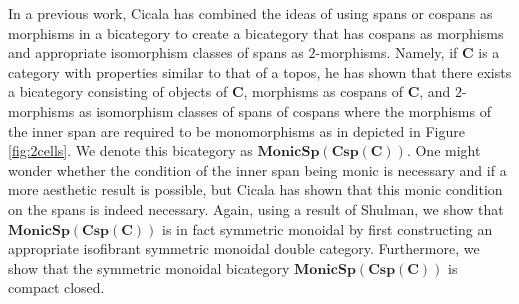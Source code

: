 \documentclass[11pt]{amsart}
\newcommand{\cat}[1]{\mathbf{#1}}
\theoremstyle{remark}
\theoremstyle{definition}
\begin{document}
In a previous work, Cicala \cite{Cic} has combined the ideas of using spans or cospans as morphisms in a bicategory to create a bicategory that has cospans as morphisms and appropriate isomorphism classes of spans as $2$-morphisms. Namely, if $\cat{C}$ is a category with properties similar to that of a topos, he has shown that there exists a bicategory consisting of objects of $\cat{C}$, morphisms as cospans of $\cat{C}$, and $2$-morphisms as isomorphism classes of spans of cospans where the morphisms of the inner span are required to be monomorphisms as in depicted in Figure \ref{fig:2cells}. We denote this bicategory as $\cat{MonicSp(Csp(C))}$. One might wonder whether the condition of the inner span being monic is necessary and if a more aesthetic result is possible, but Cicala has shown that this monic condition on the spans is indeed necessary. Again, using a result of Shulman, we show that $\cat{MonicSp(Csp(C))}$ is in fact symmetric monoidal by first constructing an appropriate isofibrant symmetric monoidal double category. Furthermore, we show that the symmetric monoidal bicategory $\cat{MonicSp(Csp(C))}$ is compact closed.
\end{document}
